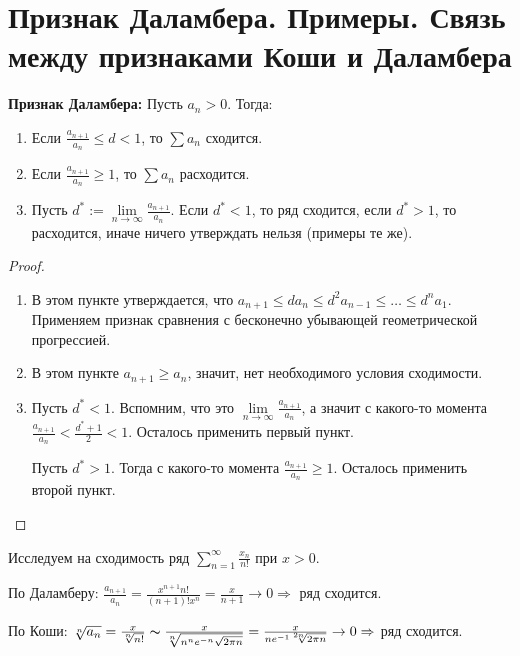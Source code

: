\section{Признак Даламбера. Примеры. Связь между признаками Коши и Даламбера}
\textbf{Признак Даламбера:} 
Пусть $a_n > 0$. Тогда: \begin{enumerate}
    \item Если $\frac{a_{n+1}}{a_n} \leqslant d < 1$, то $\sum a_n$ сходится.
    \item Если $\frac{a_{n+1}}{a_n} \geqslant 1$, то $\sum a_n$ расходится.
    \item Пусть $d^* := \lim\limits_{n \to \infty} \frac{a_{n+1}}{a_n}$. Если $d^* < 1$, то ряд сходится, если $d^* > 1$, то расходится, иначе ничего утверждать нельзя (примеры те же).
\end{enumerate}
\begin{proof} \quad

    \begin{enumerate}
        \item В этом пункте утверждается, что $a_{n+1} \leqslant da_n \leqslant d^2a_{n - 1} \leqslant \dots \leqslant d^na_1$. Применяем признак сравнения с бесконечно убывающей геометрической прогрессией.
        \item В этом пункте $a_{n+1} \geqslant a_n$, значит, нет необходимого условия сходимости.
        \item Пусть $d^* < 1$. Вспомним, что это $\lim\limits_{n \to \infty} \frac{a_{n+1}}{a_n}$, а значит с какого-то момента $\frac{a_{n+1}}{a_n} < \frac{d^* + 1}{2} < 1$. Осталось применить первый пункт.
        
        Пусть $d^* > 1$. Тогда с какого-то момента $\frac{a_{n+1}}{a_n} \geqslant 1$. Осталось применить второй пункт.
    \end{enumerate}
\end{proof}

\begin{example}
    Исследуем на сходимость ряд $\sum\limits_{n = 1}^\infty \frac{x_n}{n!}$ при $x > 0$.

    По Даламберу: $\frac{a_{n+1}}{a_n} = \frac{x^{n+1}n!}{(n+1)!x^n} = \frac{x}{n+1} \to 0 \Rightarrow$ ряд сходится.

    По Коши: $\sqrt[n]{a_n} = \frac{x}{\sqrt[n]{n!}} \thicksim \frac{x}{\sqrt[n]{n^ne^{-n}\sqrt{2\pi n}}} = \frac{x}{ne^{-1}\sqrt[2n]{2\pi n}} \to 0 \Rightarrow$ ряд сходится.
\end{example}

\vspace{5mm}


